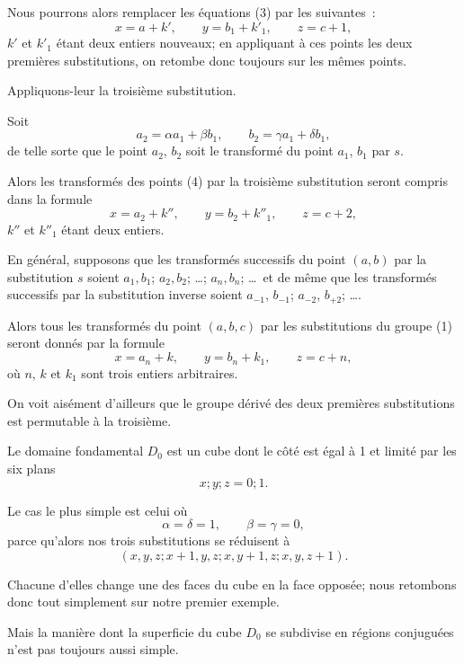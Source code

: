 \documentclass{article}
\begin{document}
Nous pourrons alors remplacer les équations (3) par les suivantes~:
\[ x = a + k', \qquad y = b_{1} + k'_{1}, \qquad z = c + 1, \tag{4} \]
$k'$ et $k'_{1}$ étant deux entiers nouveaux; en appliquant à ces points les deux premières substitutions, on retombe donc toujours sur les mêmes points.

Appliquons-leur la troisième substitution.

Soit
\[ a_{2} = \alpha a_{1} + \beta b_{1}, \qquad b_{2} = \gamma a_{1} + \delta b_{1}, \]
de telle sorte que le point $a_{2}$, $b_{2}$ soit le transformé du point $a_{1}$, $b_{1}$ par $s$.

Alors les transformés des points (4) par la troisième substitution seront compris dans la formule
\[ x = a_{2} + k'', \qquad y = b_{2} + k''_{1}, \qquad z = c + 2, \tag{5} \]
$k''$ et $k''_{1}$ étant deux entiers.

En général, supposons que les transformés successifs du point $(a, b)$ par la substitution $s$ soient $a_{1}, b_{1}$; $a_{2}, b_{2}$; \ldots; $a_{n}, b_{n}$; \ldots\ et de même que les transformés successifs par la substitution inverse soient $a_{-1}$, $b_{-1}$; $a_{-2}$, $b_{+2}$; \ldots.

Alors tous les transformés du point $(a, b, c)$ par les substitutions du groupe (1) seront donnés par la formule
\[ x = a_{n} + k, \qquad y = b_{n} + k_{1}, \qquad z = c + n, \]
où $n$, $k$ et $k_{1}$ sont trois entiers arbitraires.

On voit aisément d'ailleurs que le groupe dérivé des deux premières substitutions est permutable à la troisième.

Le domaine fondamental $D_{0}$ est un cube dont le côté est égal à 1 et limité par les six plans
\[ x; y; z = 0; 1. \]

Le cas le plus simple est celui où
\[ \alpha = \delta = 1, \qquad \beta = \gamma = 0, \]
parce qu'alors nos trois substitutions se réduisent à
\[ (x, y, z; x + 1, y, z; x, y + 1, z; x, y, z + 1). \]

Chacune d'elles change une des faces du cube en la face opposée; nous retombons donc tout simplement sur notre premier exemple.

Mais la manière dont la superficie du cube $D_{0}$ se subdivise en régions conjuguées n'est pas toujours aussi simple.
\end{document}
